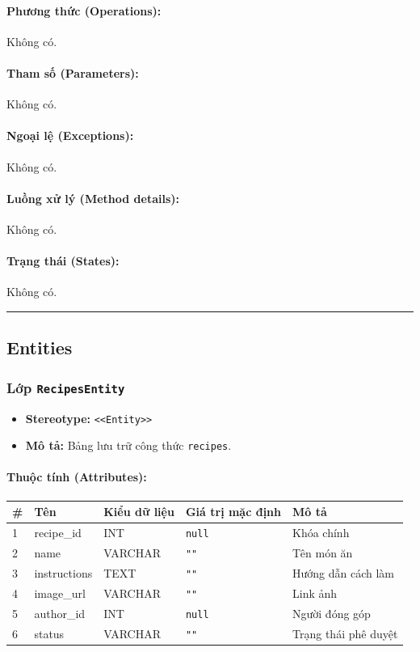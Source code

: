 \documentclass[12pt,a4paper]{article}
\begin{document}
\paragraph{Phương thức (Operations):}
Không có.

\paragraph{Tham số (Parameters):}
Không có.

\paragraph{Ngoại lệ (Exceptions):}
Không có.

\paragraph{Luồng xử lý (Method details):}
Không có.

\paragraph{Trạng thái (States):}
Không có.

\vskip 0.5cm
\noindent\rule{\textwidth}{0.5pt}
\vskip 0.5cm

\subsection{Entities}


\subsubsection{Lớp \texttt{RecipesEntity}}

\begin{itemize}[leftmargin=*]
    \item \textbf{Stereotype:} \texttt{\textless{}\textless{}Entity\textgreater{}\textgreater{}}
    \item \textbf{Mô tả:} Bảng lưu trữ công thức \texttt{recipes}.
\end{itemize}

\paragraph{Thuộc tính (Attributes):}
\begin{longtable}{|p{0.6cm}|p{3.5cm}|p{2.4cm}|p{1.8cm}|p{5.1cm}|}
\hline
\textbf{\#} & \textbf{Tên} & \textbf{Kiểu dữ liệu} & \textbf{Giá trị mặc định} & \textbf{Mô tả} \\ \hline
\endhead
1 & recipe\_id & INT & \texttt{null} & Khóa chính \\ \hline
2 & name & VARCHAR & \texttt{""} & Tên món ăn \\ \hline
3 & instructions & TEXT & \texttt{""} & Hướng dẫn cách làm \\ \hline
4 & image\_url & VARCHAR & \texttt{""} & Link ảnh \\ \hline
5 & author\_id & INT & \texttt{null} & Người đóng góp \\ \hline
6 & status & VARCHAR & \texttt{""} & Trạng thái phê duyệt \\ \hline
\end{longtable}
\end{document}
